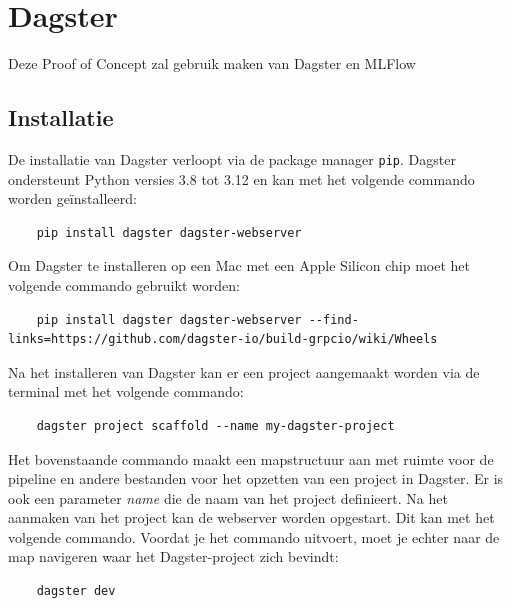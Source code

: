 \section{Dagster}
Deze Proof of Concept zal gebruik maken van Dagster en MLFlow
\subsection{Installatie}
De installatie van Dagster verloopt via de package manager \texttt{pip}. Dagster ondersteunt Python versies 3.8 tot 3.12 en kan met het volgende commando worden geïnstalleerd:
\begin{verbatim}
    pip install dagster dagster-webserver
\end{verbatim}
Om Dagster te installeren op een Mac met een Apple Silicon chip moet het volgende commando gebruikt worden:
\begin{verbatim}
    pip install dagster dagster-webserver --find-links=https://github.com/dagster-io/build-grpcio/wiki/Wheels
\end{verbatim}
Na het installeren van Dagster kan er een project aangemaakt worden via de terminal met het volgende commando:
\begin{verbatim}
    dagster project scaffold --name my-dagster-project
\end{verbatim}
Het bovenstaande commando maakt een mapstructuur aan met ruimte voor de pipeline en andere bestanden voor het opzetten van een project in Dagster. Er is ook een parameter \textit{name} die de naam van het project definieert.
Na het aanmaken van het project kan de webserver worden opgestart. Dit kan met het volgende commando. Voordat je het commando uitvoert, moet je echter naar de map navigeren waar het Dagster-project zich bevindt:
\begin{verbatim}
    dagster dev
\end{verbatim}
